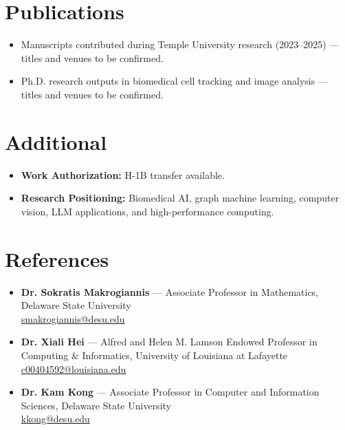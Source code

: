 \documentclass[11pt,a4paper,sans]{moderncv}
\begin{document}

\section{Publications}
\vspace{1pt}
\begin{itemize}
\item Manuscripts contributed during Temple University research (2023--2025) — titles and venues to be confirmed.
\item Ph.D. research outputs in biomedical cell tracking and image analysis — titles and venues to be confirmed.
\end{itemize}


\section{Additional}
\vspace{1pt}
\begin{itemize}
\item{\textbf{Work Authorization:} H-1B transfer available.}
\item{\textbf{Research Positioning:} Biomedical AI, graph machine learning, computer vision, LLM applications, and high-performance computing.}
\end{itemize}


\section{References}
\vspace{1pt}
\begin{itemize}
\item \textbf{Dr. Sokratis Makrogiannis} --- Associate Professor in Mathematics, Delaware State University\\
\href{mailto:smakrogiannis@desu.edu}{smakrogiannis@desu.edu}

\item \textbf{Dr. Xiali Hei} --- Alfred and Helen M. Lamson Endowed Professor in Computing \& Informatics, University of Louisiana at Lafayette\\
\href{mailto:c00404592@louisiana.edu}{c00404592@louisiana.edu}

\item \textbf{Dr. Kam Kong} --- Associate Professor in Computer and Information Sciences, Delaware State University\\
\href{mailto:kkong@desu.edu}{kkong@desu.edu}
\end{itemize}
\end{document}

